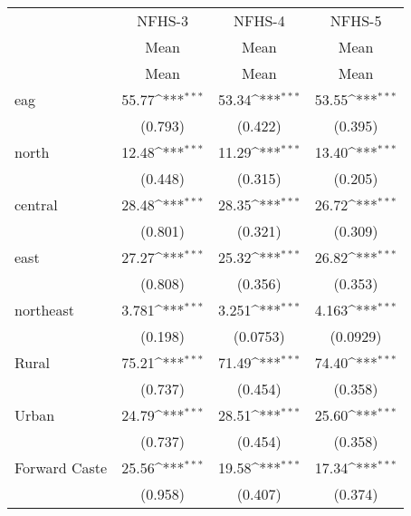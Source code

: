 {
\def\sym#1{\ifmmode^{#1}\else\(^{#1}\)\fi}
\begin{tabular}{l*{3}{c}}
\hline\hline
                    &      NFHS-3         &      NFHS-4         &      NFHS-5         \\
                    &\multicolumn{1}{c}{Mean}&\multicolumn{1}{c}{Mean}&\multicolumn{1}{c}{Mean}\\
                    &        Mean         &        Mean         &        Mean         \\
\hline
eag                 &       55.77\sym{***}&       53.34\sym{***}&       53.55\sym{***}\\
                    &     (0.793)         &     (0.422)         &     (0.395)         \\
[1em]
north               &       12.48\sym{***}&       11.29\sym{***}&       13.40\sym{***}\\
                    &     (0.448)         &     (0.315)         &     (0.205)         \\
[1em]
central             &       28.48\sym{***}&       28.35\sym{***}&       26.72\sym{***}\\
                    &     (0.801)         &     (0.321)         &     (0.309)         \\
[1em]
east                &       27.27\sym{***}&       25.32\sym{***}&       26.82\sym{***}\\
                    &     (0.808)         &     (0.356)         &     (0.353)         \\
[1em]
northeast           &       3.781\sym{***}&       3.251\sym{***}&       4.163\sym{***}\\
                    &     (0.198)         &    (0.0753)         &    (0.0929)         \\
[1em]
Rural               &       75.21\sym{***}&       71.49\sym{***}&       74.40\sym{***}\\
                    &     (0.737)         &     (0.454)         &     (0.358)         \\
[1em]
Urban               &       24.79\sym{***}&       28.51\sym{***}&       25.60\sym{***}\\
                    &     (0.737)         &     (0.454)         &     (0.358)         \\
[1em]
Forward Caste       &       25.56\sym{***}&       19.58\sym{***}&       17.34\sym{***}\\
                    &     (0.958)         &     (0.407)         &     (0.374)         \\

\end{tabular}}
